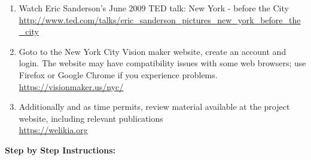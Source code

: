 \documentclass{article}
\begin{document}
\begin{enumerate}[leftmargin=15mm]

\item Watch Eric Sanderson's June 2009 TED talk: New York - before the City \\  
\url{http://www.ted.com/talks/eric_sanderson_pictures_new_york_before_the_city}

\item Goto to the New York City Vision maker website, create an account and login.  The website may have compatibility issues with some web browsers; use Firefox or Google Chrome if you experience problems. \\ 
\url{https://visionmaker.us/nyc/}

\item Additionally and as time permits, review material available at the project website, including relevant publications \\ 
\url{https://welikia.org}

\end{enumerate}


\large{\textbf{Step by Step Instructions:}}
\end{document}
